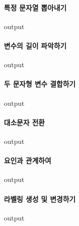 \documentclass{report}
\begin{document}
\paragraph{특정 문자열 뽑아내기}
\begin{Schunk}
\begin{Soutput}
output
\end{Soutput}
\end{Schunk}

\paragraph{변수의 길이 파악하기}
\begin{Schunk}
\begin{Soutput}
output
\end{Soutput}
\end{Schunk}

\paragraph{두 문자형 변수 결합하기}
\begin{Schunk}
\begin{Soutput}
output
\end{Soutput}
\end{Schunk}

\paragraph{대소문자 전환} 
\begin{Schunk}
\begin{Soutput}
output
\end{Soutput}
\end{Schunk}

\paragraph{요인과 관계하여}
\begin{Schunk}
\begin{Soutput}
output
\end{Soutput}
\end{Schunk}

\paragraph{라벨링 생성 및 변경하기}
\begin{Schunk}
\begin{Soutput}
output
\end{Soutput}
\end{Schunk}
\end{document}
